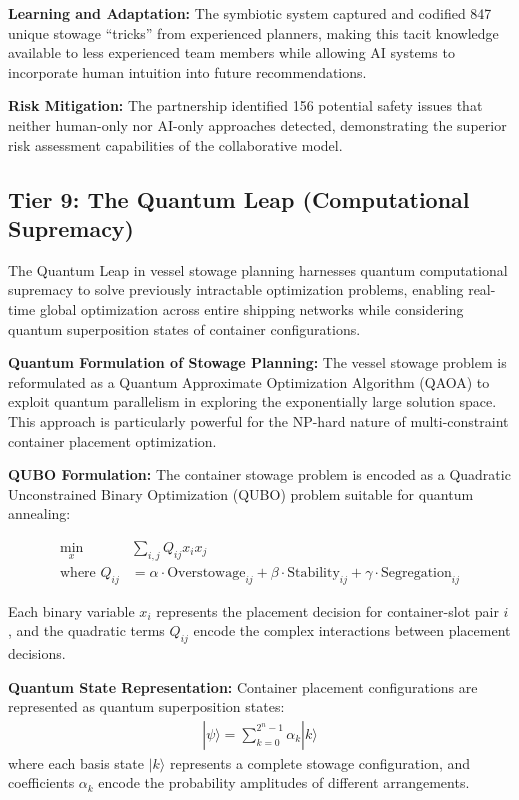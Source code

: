 \documentclass{article}
\begin{document}
\textbf{Learning and Adaptation:} The symbiotic system captured and codified 847 unique stowage ``tricks'' from experienced planners, making this tacit knowledge available to less experienced team members while allowing AI systems to incorporate human intuition into future recommendations.

\textbf{Risk Mitigation:} The partnership identified 156 potential safety issues that neither human-only nor AI-only approaches detected, demonstrating the superior risk assessment capabilities of the collaborative model.

\subsection{Tier 9: The Quantum Leap (Computational Supremacy)}

The Quantum Leap in vessel stowage planning harnesses quantum computational supremacy to solve previously intractable optimization problems, enabling real-time global optimization across entire shipping networks while considering quantum superposition states of container configurations.

\textbf{Quantum Formulation of Stowage Planning:}
The vessel stowage problem is reformulated as a Quantum Approximate Optimization Algorithm (QAOA) to exploit quantum parallelism in exploring the exponentially large solution space. This approach is particularly powerful for the NP-hard nature of multi-constraint container placement optimization.

\textbf{QUBO Formulation:}
The container stowage problem is encoded as a Quadratic Unconstrained Binary Optimization (QUBO) problem suitable for quantum annealing:

\begin{align}
\min_{x} \quad & \sum_{i,j} Q_{ij} x_i x_j \\
\text{where } Q_{ij} &= \alpha \cdot \text{Overstowage}_{ij} + \beta \cdot \text{Stability}_{ij} + \gamma \cdot \text{Segregation}_{ij}
\end{align}

Each binary variable $x_i$ represents the placement decision for container-slot pair $i$, and the quadratic terms $Q_{ij}$ encode the complex interactions between placement decisions.

\textbf{Quantum State Representation:}
Container placement configurations are represented as quantum superposition states:
\begin{align}
|\psi\rangle = \sum_{k=0}^{2^n-1} \alpha_k |k\rangle
\end{align}
where each basis state $|k\rangle$ represents a complete stowage configuration, and coefficients $\alpha_k$ encode the probability amplitudes of different arrangements.
\end{document}
